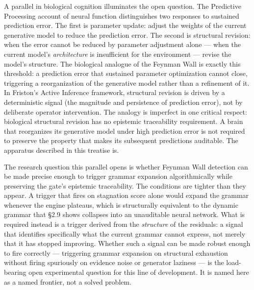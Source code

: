 \documentclass[11pt]{article}
\begin{document}
A parallel in biological cognition illuminates the open question. The Predictive Processing account of neural function \citep{friston2009} distinguishes two responses to sustained prediction error. The first is parameter update: adjust the weights of the current generative model to reduce the prediction error. The second is structural revision: when the error cannot be reduced by parameter adjustment alone --- when the current model's \emph{architecture} is insufficient for the environment --- revise the model's structure. The biological analogue of the Feynman Wall is exactly this threshold: a prediction error that sustained parameter optimization cannot close, triggering a reorganization of the generative model rather than a refinement of it. In Friston's Active Inference framework, structural revision is driven by a deterministic signal (the magnitude and persistence of prediction error), not by deliberate operator intervention. The analogy is imperfect in one critical respect: biological structural revision has no epistemic traceability requirement. A brain that reorganizes its generative model under high prediction error is not required to preserve the property that makes its subsequent predictions auditable. The apparatus described in this treatise is.

The research question this parallel opens is whether Feynman Wall detection can be made precise enough to trigger grammar expansion algorithmically while preserving the gate's epistemic traceability. The conditions are tighter than they appear. A trigger that fires on stagnation score alone would expand the grammar whenever the engine plateaus, which is structurally equivalent to the dynamic grammar that \S2.9 shows collapses into an unauditable neural network. What is required instead is a trigger derived from the \emph{structure} of the residuals: a signal that identifies specifically what the current grammar cannot express, not merely that it has stopped improving. Whether such a signal can be made robust enough to fire correctly --- triggering grammar expansion on structural exhaustion without firing spuriously on evidence noise or generator laziness --- is the load-bearing open experimental question for this line of development. It is named here as a named frontier, not a solved problem.
\end{document}

